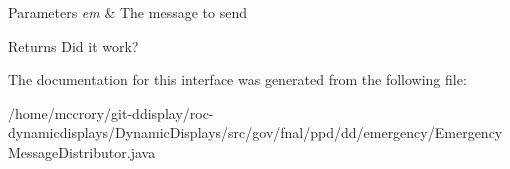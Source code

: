 \begin{DoxyParams}{Parameters}
{\em em} & The message to send \\
\hline
\end{DoxyParams}
\begin{DoxyReturn}{Returns}
Did it work? 
\end{DoxyReturn}


The documentation for this interface was generated from the following file\-:\begin{DoxyCompactItemize}
\item 
/home/mccrory/git-\/ddisplay/roc-\/dynamicdisplays/\-Dynamic\-Displays/src/gov/fnal/ppd/dd/emergency/Emergency\-Message\-Distributor.\-java\end{DoxyCompactItemize}
